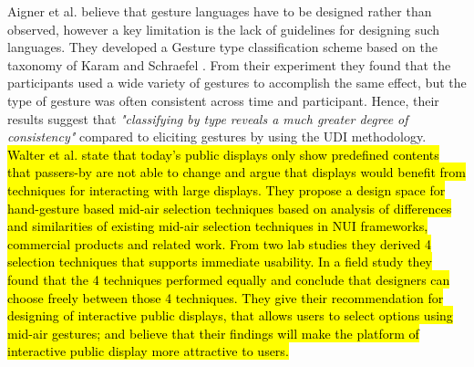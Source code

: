 Aigner et al.\cite{Aigner:2012} believe that gesture languages have to be designed rather than observed, however a key limitation is the lack of guidelines for designing such languages.
They developed a Gesture type classification scheme based on the taxonomy of Karam and Schraefel \cite{Karam:2005} .
From their experiment they found that the participants used  a  wide  variety  of  gestures  to accomplish  the  same  effect, but the  type  of  gesture was  often  consistent  across  time and participant. Hence, their results suggest that \emph{"classifying by type reveals a much greater degree of consistency"} compared to eliciting gestures by using the UDI methodology. 
\\
\hl{
Walter et al.
 state that today's public displays only show predefined contents that passers-by are not able to change and argue that displays would benefit from techniques for interacting with large displays. They propose a design space for hand-gesture based mid-air selection techniques based on analysis of differences and similarities of existing mid-air selection techniques in NUI frameworks, commercial products and related work. From two lab studies they derived 4 selection techniques that supports immediate usability. In a field study they found that the 4 techniques performed equally and conclude that designers can choose freely between those 4 techniques.
They give their recommendation for designing of interactive public displays, that allows users to select options using mid-air gestures; and believe that their findings will make the platform of interactive public display more attractive to users.}
\\

